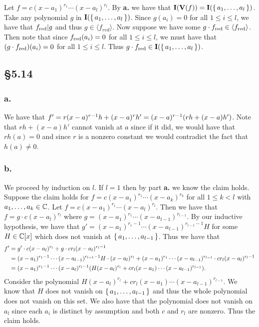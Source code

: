 \documentclass[letterpaper]{article}
\begin{document}
Let $f = c(x - a_{1})^{r_{1}} \cdots (x - a_{l})^{r_{l}}$. By \textbf{a.} we have that $\textbf{I}(\textbf{V}(f)) = \textbf{I}\pqty{\set{a_{1}, \ldots, a_{l}}}$. Take any polynomial $g$ in $\textbf{I}\pqty{\set{a_{1}, \ldots, a_{l}}}$. Since $g(a_{i}) = 0$ for all $1 \leq i \leq l$, we have that $f_{\text{red}} | g$ and thus $g \in \langle f_{red} \rangle$. Now suppose we have some $g \cdot f_{\text{red}} \in \langle f_{\text{red}} \rangle$. Then note that since $f_{\text{red}}(a_{i}) = 0$ for all $1 \leq i \leq l$, we must have that $\pqty{g \cdot f_{\red}}(a_{i}) = 0$ for all $1 \leq i \leq l$. Thus $g \cdot f_{\red} \in \textbf{I}\pqty{\set{a_{1}, \ldots, a_{l}}}$.

\subsection{\S 5.14}

\subsubsection{a.}

We have that $f' = r(x - a)^{r - 1} h + (x - a)^{r} h' = (x - a)^{r-1} \pqty{rh + (x - a)h'}$. Note that $rh + (x - a)h'$ cannot vanish at $a$ since if it did, we would have that $rh(a) = 0$ and since $r$ is a nonzero constant we would contradict the fact that $h(a) \neq 0$.

\subsubsection{b.}

We proceed by induction on $l$. If $l = 1$ then by part \textbf{a.} we know the claim holds. Suppose the claim holds for $f = c(x - a_{1})^{r_{1}} \cdots (x - a_{k})^{r_{k}}$ for all $1 \leq k < l$ with $a_{1}, \ldots, a_{k} \in \mathbb{C}$. Let $f = c(x - a_{1})^{r_{1}} \cdots (x - a_{l})^{r_{l}}$. Then we have that $f = g \cdot c (x - a_{l})^{r_{l}}$ where $g = (x - a_{1})^{r_{1}} \cdots (x - a_{l - 1})^{r_{l - 1}}$. By our inductive hypothesis, we have that $g' = (x - a_{1})^{r_{1} - 1} \cdots (x - a_{l - 1})^{r_{l - 1} - 1} H$ for some $H \in \mathbb{C}[x]$ which does not vanish at $\set{a_{1}, \ldots, a_{l -1}}$. Thus we have that
\begin{align*}
  f' &= g' \cdot c (x - a_{l})^{r_{l}} + g \cdot c r_{l}(x - a_{l})^{r_{l} - 1} \\
     &= (x - a_{1})^{r_{1} - 1} \cdots (x - a_{l - 1})^{r_{l - 1} - 1} H \cdot (x - a_{l})^{r_{l}} + (x - a_{1})^{r_{1}} \cdots (x - a_{l - 1})^{r_{l - 1}} \cdot c r_{l}(x - a_{l})^{r_{l} - 1} \\
     &= (x - a_{1})^{r_{1} - 1} \cdots (x - a_{l})^{r_{l} - 1} \pqty{H(x - a_{l})^{r_{l}} + c r_{l}(x - a_{1}) \cdots (x - a_{l - 1})^{r_{l - 1}}}.
\end{align*}
Consider the polynomial $H(x - a_{l})^{r_{l}} + c r_{l}(x - a_{1}) \cdots (x - a_{l - 1})^{r_{l - 1}}$. We know that $H$ does not vanish on $\set{a_{1}, \ldots, a_{l -1}}$ and thus the whole polynomial does not vanish on this set. We also have that the polynomial does not vanish on $a_{l}$ since each $a_{i}$ is distinct by assumption and both $c$ and $r_{l}$ are nonzero. Thus the claim holds.
\end{document}
